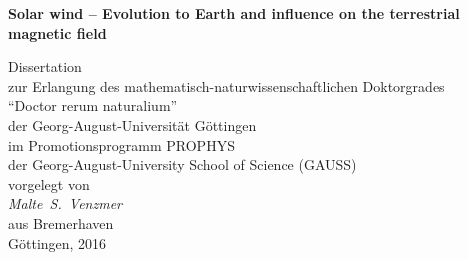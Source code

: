 \begin{titlepage}
	\begin{center}
		\vspace*{10mm}
		\Large
		\sffamily
		\textbf{Solar wind -- Evolution to Earth and influence on the terrestrial magnetic field}
		
		\vspace{25mm}
		\large
		Dissertation\\
		\vspace{4mm}
		zur Erlangung des mathematisch-naturwissenschaftlichen Doktorgrades\\
		\vspace{4mm}
		``Doctor rerum naturalium''\\
		\vspace{4mm}
		der Georg-August-Universität Göttingen\\
		\vspace{15mm}
		im Promotionsprogramm PROPHYS\\
		\vspace{4mm}
		der Georg-August-University School of Science (GAUSS)\\
		\vspace{20mm}
		vorgelegt von\\
		\vspace{4mm}
		\textit{Malte~S.~Venzmer}\\
		\vspace{10mm}
		aus Bremerhaven\\
		\vspace{4mm}
		Göttingen, 2016\\

	\end{center}
\end{titlepage}

